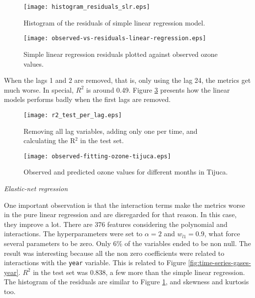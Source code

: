 \begin{figure}
    \centering
    \texttt{[image: histogram\_residuals\_slr.eps]}
    \caption{Histogram of the residuals of simple linear regression model.}
    \label{fig:histogram-residuals-slr}
\end{figure}

\begin{figure}[!ht]
    \centering
    \texttt{[image: observed-vs-residuals-linear-regression.eps]}
    \caption{Simple linear regression residuals plotted against
    observed ozone values.}
    \label{fig:observed-vs-residual-linear-regression}
\end{figure}

When the lags 1 and 2 are removed, that is, only using the lag 24, the metrics
get much worse. In special, $R^2$ is around 0.49. Figure \ref{fig:r2-test-lag}
presents how the linear models performs badly when the first lags are removed.


\begin{figure}[!ht]
    \centering
    \texttt{[image: r2\_test\_per\_lag.eps]}
    \caption{Removing all lag variables, adding only one per time, and calculating the R$^2$ in the test set.}
    \label{fig:r2-test-lag}
\end{figure}

\begin{figure*}[!ht]
    \centering
    \texttt{[image: observed-fitting-ozone-tijuca.eps]}
    \caption{Observed and predicted ozone values for different months in Tijuca.}
    \label{fig:observed-fitting-ozone-tijuca}
\end{figure*}

\vspace{2mm}

{\em Elastic-net regression}

\vspace{2mm}

One important observation is that the interaction terms make the metrics worse
in the pure linear regression and are disregarded for that reason. In this
case, they improve a lot. There are 376 features considering the polynomial
and interactions. The hyperparameters were set to $\alpha = 2$ and
$w_{l1} = 0.9$, what force several parameters to be zero. Only 6\% of the
variables ended to be non null. The result was interesting because all the non
zero coefficients were related to interactions with the {\tt year} variable.
This is related to Figure \ref{fig:time-series-gases-year}. $R^2$ in the test
set was 0.838, a few more than the simple linear regression. The histogram of
the residuals are similar to Figure \ref{fig:histogram-residuals-slr}, and
skewness and kurtosis too.

